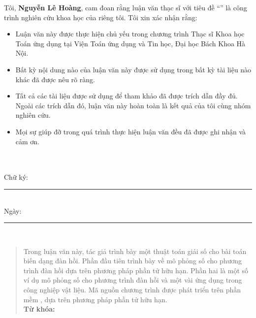 \documentclass[
12pt, %
oneside, %
english, %
onehalfspacing, %
nolistspacing, %
headsepline, %
addchap,
]{MastersDoctoralThesis} %
\begin{document}

\begin{declaration}
\noindent Tôi, \textbf{Nguyễn Lê Hoàng}, cam đoan rằng luận văn thạc sĩ với tiêu đề \enquote{\em{\ttitle}} là công trình nghiên cứu khoa học của riêng tôi. Tôi xin xác nhận rằng:

\begin{itemize} 
\item Luận văn này được thực hiện chủ yếu trong chương trình Thạc sĩ Khoa học Toán ứng dụng tại Viện Toán ứng dụng và Tin học, Đại học Bách Khoa Hà Nội.
\item Bất kỳ nội dung nào của luận văn này được sử dụng trong bất kỳ tài liệu nào khác đã được nêu rõ ràng.
\item Tất cả các tài liệu được sử dụng để tham khảo đã được trích dẫn đầy đủ. Ngoài các trích dẫn đó, luận văn này hoàn toàn là kết quả của tôi cùng nhóm nghiên cứu.
\item Mọi sự giúp đỡ trong quá trình thực hiện luận văn đều đã được ghi nhận và cảm ơn.\\\\\\
\end{itemize}
 
\noindent Chữ ký:\\
\rule[0.5em]{20em}{0.5pt} %
\\
\noindent Ngày: \\
\rule[0.5em]{20em}{0.5pt} %
\end{declaration}\\

\cleardoublepage


\begin{abstract}
Trong luận văn này, tác giả trình bày một thuật toán giải số cho bài toán biến dạng đàn hồi. Phần đầu tiên trình bày về mô phỏng số cho phương trình đàn hồi dựa trên phương pháp phần tử hữu hạn. Phần hai là một số ví dụ mô phỏng số cho phương trình đàn hồi và một vài ứng dụng trong công nghiệp vật liệu. Mã nguồn chương trình được phát triển trên phần mềm , dựa trên phương pháp phần tử hữu hạn.\\

\noindent \textbf{Từ khóa:} \keywordnames
\end{abstract}
\end{document}
